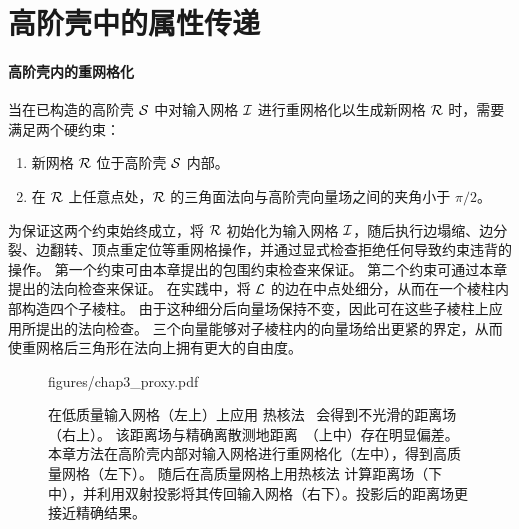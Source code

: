 \section{高阶壳中的属性传递}

\paragraph{高阶壳内的重网格化}
当在已构造的高阶壳 $\mathcal{S}$ 中对输入网格 $\mathcal{I}$ 进行重网格化以生成新网格 $\mathcal{R}$ 时，需要满足两个硬约束：
\begin{enumerate}
  \item 新网格 $\mathcal{R}$ 位于高阶壳 $\mathcal{S}$ 内部。
  \item 在 $\mathcal{R}$ 上任意点处，$\mathcal{R}$ 的三角面法向与高阶壳向量场之间的夹角小于 $\pi/2$。
\end{enumerate}
为保证这两个约束始终成立，将 $\mathcal{R}$ 初始化为输入网格 $\mathcal{I}$，随后执行边塌缩、边分裂、边翻转、顶点重定位等重网格操作，并通过显式检查拒绝任何导致约束违背的操作。
%
第一个约束可由本章提出的包围约束检查来保证。
%
第二个约束可通过本章提出的法向检查来保证。
%
在实践中，将 $\mathcal{L}$ 的边在中点处细分，从而在一个棱柱内部构造四个子棱柱。
%
由于这种细分后向量场保持不变，因此可在这些子棱柱上应用所提出的法向检查。
%
三个向量能够对子棱柱内的向量场给出更紧的界定，从而使重网格后三角形在法向上拥有更大的自由度。


\begin{figure}[t]
	\centering
	\begin{overpic}[width=0.99\linewidth]{figures/chap3_proxy.pdf}
		{
		}
	\end{overpic}
	\vspace{0mm}
	\caption{
		在低质量输入网格（左上）上应用 热核法~\cite{Crane2012GeodesicsIH} 会得到不光滑的距离场（右上）。
  该距离场与精确离散测地距离~\cite{mitchell1987discrete}（上中）存在明显偏差。
本章方法在高阶壳内部对输入网格进行重网格化（左中），得到高质量网格（左下）。
  随后在高质量网格上用热核法 计算距离场（下中），并利用双射投影将其传回输入网格（右下）。投影后的距离场更接近精确结果。
	}
	\label{fig:proxy}
\end{figure}

